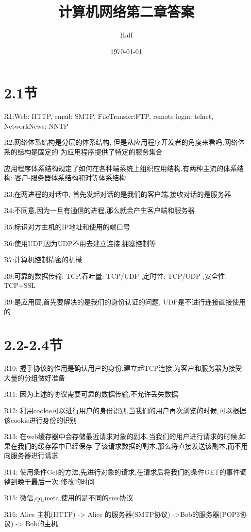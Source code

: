 \documentclass[UTF8]{ctexart}
\title{计算机网络第二章答案}
\author{Half}
\date{\today}
\begin{document}
\maketitle
\section{2.1节}
R1:Web: HTTP, email: SMTP, FileTransfer:FTP, remote login: telnet, NetworkNews: NNTP

R2:网络体系结构是分层的体系结构, 但是从应用程序开发者的角度来看吗,网络体系的结构是固定的
为应用程序提供了特定的服务集合
\par
应用程序体系结构规定了如何在各种端系统上组织应用结构,有两种主流的体系结构: 客户-服务器体系结构和对等体系结构

R3:在两进程的对话中, 首先发起对话的是我们的客户端,接收对话的是服务器

R4:不同意,因为一旦有通信的进程,那么就会产生客户端和服务器

R5:标识对方主机的IP地址和使用的端口号

R6:使用UDP,因为UDP不用去建立连接,拥塞控制等

R7:计算机控制精密的机械

R8:可靠的数据传输: TCP,吞吐量: TCP/UDP ,定时性: TCP/UDP ,安全性: TCP+SSL

R9:是应用层,首先要解决的是我们的身份认证的问题, UDP是不进行连接直接使用的

\section{2.2-2.4节}
R10: 握手协议的作用是确认用户的身份,建立起TCP连接,为客户和服务器为接受大量的分组做好准备

R11: 因为上述的协议需要可靠的数据传输,不允许丢失数据

R12: 利用cookie可以进行用户的身份识别,当我们的用户再次浏览的时候,可以根据该cookie进行身份的识别

R13: 在web缓存器中会存储最近请求对象的副本,当我们的用户进行请求的时候,如果在我们的缓存器中已经保存
了该请求数据的副本,那么将直接发送该副本,而不用向服务器进行请求

R14: 使用条件Get的方法,先进行对象的请求,在请求后将我们的条件GET的事件调整到晚于最后一次
修改的时间

R15: 微信,qq,meta,使用的是不同的sms协议

R16: Alice 主机(HTTP) -> Alice 的服务器(SMTP协议) ->Bob的服务器(POP3协议) -> Bob的主机
\end{document}
